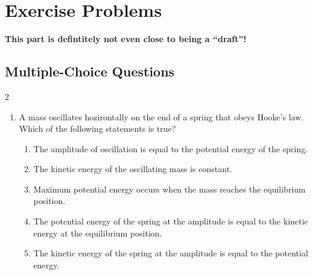 \newpage
\section*{Exercise Problems}
\textbf{This part is defintitely not even close to being a ``draft''!}
\subsection*{Multiple-Choice Questions}
{\small

\begin{multicols}{2}
  \begin{enumerate}[leftmargin=12pt]
  \item A mass oscillates hozirontally on the end of a spring that obeys
    Hooke's law. Which of the following statements is true?
    \begin{enumerate}[label=(\Alph*)]
    \item The amplitude of oscillation is equal to the potential energy of the
      spring.
    \item The kinetic energy of the oscillating mass is constant.
    \item Maximum potential energy occurs when the mass reaches the equilibrium
      position.
    \item The potential energy of the spring at the amplitude is equal to the
      kinetic energy at the equilibrium position.
    \item The kinetic energy of the spring at the amplitude is equal to the
      potential energy.
    \end{enumerate}

    

\end{enumerate}
\end{multicols}}
